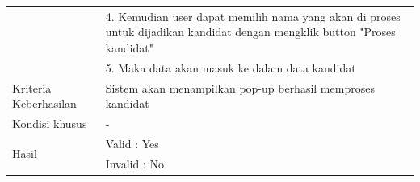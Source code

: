 \begin{table}
\begin{tabular}{ | l | p{92mm} |}
		& 4.	Kemudian user dapat memilih nama yang akan di proses untuk dijadikan kandidat dengan mengklik button  "Proses kandidat" \\
		
		& 5.	Maka data akan masuk ke dalam data kandidat \\
		\hline
		
		Kriteria Keberhasilan & Sistem akan menampilkan pop-up berhasil memproses kandidat\\
		\hline
		
		Kondisi khusus & - \\
		\hline
		
		\multirow{2}{*}{Hasil} & Valid : Yes \\
		
		
		& Invalid : No \\
		\hline
		
		
	\end{tabular}
\end{table}

